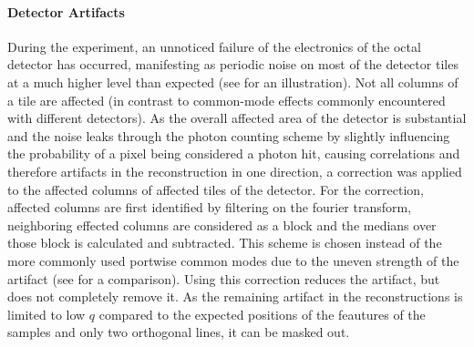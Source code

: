 \paragraph{Detector Artifacts}
During the experiment, an unnoticed failure of the electronics of the octal detector has occurred, manifesting as periodic noise on most of the detector tiles at a much higher level than expected (see  for an illustration). Not all columns of a tile are affected (in contrast to common-mode effects commonly encountered with different detectors). As the overall affected area of the detector is substantial and the noise leaks through the photon counting scheme by slightly influencing the probability of a pixel being considered a photon hit, causing correlations and therefore artifacts in the reconstruction in one direction, a correction was applied to the affected columns of affected tiles of the detector. For the correction, affected columns are first identified by filtering on the fourier transform, neighboring effected columns are considered as a block and the medians over those block is calculated and subtracted. This scheme is chosen instead of the more commonly used portwise common modes due to the uneven strength of the artifact (see  for a comparison). Using this correction reduces the artifact, but does not completely remove it. As the remaining artifact in the reconstructions is limited to low $q$ compared to the expected positions of the feautures of the samples and only two orthogonal lines, it can be masked out.




